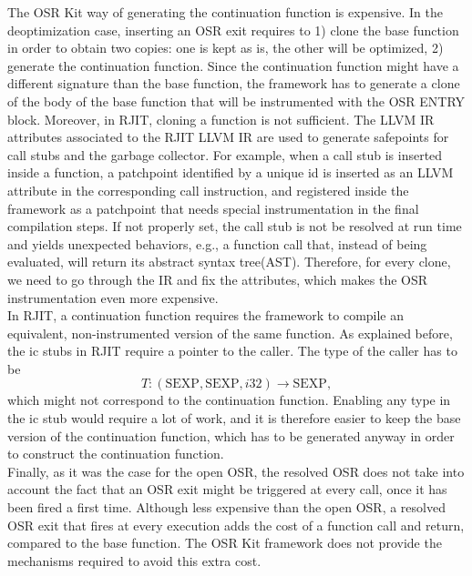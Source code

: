 The OSR Kit way of generating the continuation function is expensive.
In the deoptimization case, inserting an OSR exit requires to 1) clone the base function in order to obtain two copies: one is kept as is, the other will be optimized, 2) generate the continuation function. 
Since the continuation function might have a different signature than the base function, the framework has to generate a clone of the body of the base function that will be instrumented with the OSR ENTRY block.
Moreover, in RJIT, cloning a function is not sufficient.
The LLVM IR attributes\cite{llvmAttribute} associated to the RJIT LLVM IR are used to generate safepoints for call stubs and the garbage collector.
For example, when a call stub is inserted inside a function, a patchpoint identified by a unique id is inserted as an LLVM attribute in the corresponding call instruction, and registered inside the framework as a patchpoint that needs special instrumentation in the final compilation steps.
If not properly set, the call stub is not be resolved at run time and yields unexpected behaviors, e.g., a function call that, instead of being evaluated, will return its abstract syntax tree(AST).
Therefore, for every clone, we need to go through the IR and fix the attributes, which makes the OSR instrumentation even more expensive.\\

In RJIT, a continuation function requires the framework to compile an equivalent, non-instrumented version of the same function.
As explained before, the ic stubs in RJIT require a pointer to the caller.
The type of the caller has to be 
$$T: (\text{SEXP}, \text{SEXP}, i32) \rightarrow \text{SEXP},$$
which might not correspond to the continuation function.
Enabling any type in the ic stub would require a lot of work, and it is therefore easier to keep the base version of the continuation function, which has to be generated anyway in order to construct the continuation function.\\

Finally, as it was the case for the open OSR, the resolved OSR does not take into account the fact that an OSR exit might be triggered at every call, once it has been fired a first time.
Although less expensive than the open OSR, a resolved OSR exit that fires at every execution adds the cost of a function call and return, compared to the base function.
The OSR Kit framework does not provide the mechanisms required to avoid this extra cost.\\

